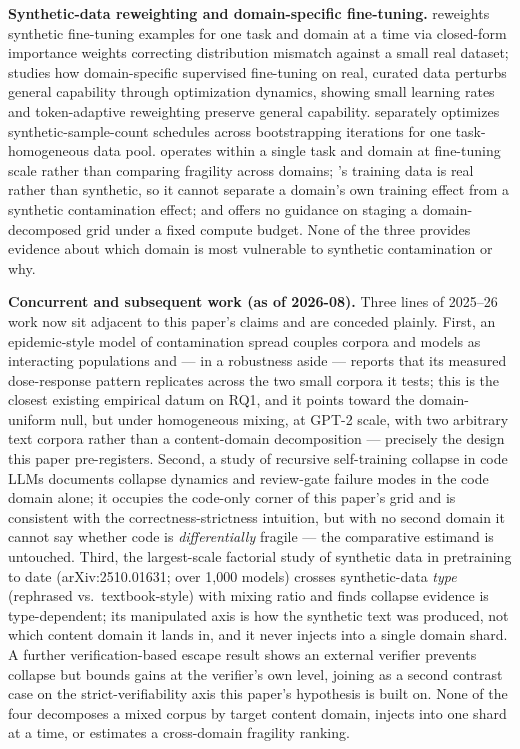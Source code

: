 \documentclass[11pt]{article}
\begin{document}
\textbf{Synthetic-data reweighting and domain-specific fine-tuning.} \citet{SynthWeighting2023} reweights synthetic fine-tuning examples for one task and domain at a time via closed-form importance weights correcting distribution mismatch against a small real dataset; \citet{TALR2023} studies how domain-specific supervised fine-tuning on real, curated data perturbs general capability through optimization dynamics, showing small learning rates and token-adaptive reweighting preserve general capability. \citet{SpendWisely2023} separately optimizes synthetic-sample-count schedules across bootstrapping iterations for one task-homogeneous data pool. \citet{SynthWeighting2023} operates within a single task and domain at fine-tuning scale rather than comparing fragility across domains; \citet{TALR2023}'s training data is real rather than synthetic, so it cannot separate a domain's own training effect from a synthetic contamination effect; and \citet{SpendWisely2023} offers no guidance on staging a domain-decomposed grid under a fixed compute budget. None of the three provides evidence about which domain is most vulnerable to synthetic contamination or why.

\textbf{Concurrent and subsequent work (as of 2026-08).} Three lines of 2025--26 work now sit adjacent to this paper's claims and are conceded plainly. First, an epidemic-style model of contamination spread \citep{EpidemiologyCollapse2026} couples corpora and models as interacting populations and --- in a robustness aside --- reports that its measured dose-response pattern replicates across the two small corpora it tests; this is the closest existing empirical datum on RQ1, and it points toward the domain-uniform null, but under homogeneous mixing, at GPT-2 scale, with two arbitrary text corpora rather than a content-domain decomposition --- precisely the design this paper pre-registers. Second, a study of recursive self-training collapse in code LLMs \citep{CodeRecursiveCollapse2026} documents collapse dynamics and review-gate failure modes in the code domain alone; it occupies the code-only corner of this paper's grid and is consistent with the correctness-strictness intuition, but with no second domain it cannot say whether code is \emph{differentially} fragile --- the comparative estimand is untouched. Third, the largest-scale factorial study of synthetic data in pretraining to date (arXiv:2510.01631; over 1,000 models) crosses synthetic-data \emph{type} (rephrased vs.\ textbook-style) with mixing ratio and finds collapse evidence is type-dependent; its manipulated axis is how the synthetic text was produced, not which content domain it lands in, and it never injects into a single domain shard. A further verification-based escape result \citep{VerifierEscape2025} shows an external verifier prevents collapse but bounds gains at the verifier's own level, joining \citet{IterativeDeploymentImpro} as a second contrast case on the strict-verifiability axis this paper's hypothesis is built on. None of the four decomposes a mixed corpus by target content domain, injects into one shard at a time, or estimates a cross-domain fragility ranking.
\end{document}
